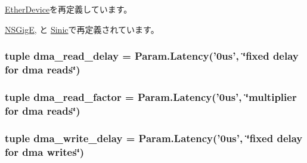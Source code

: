 \hyperlink{classEthernet_1_1EtherDevice_a17da7064bc5c518791f0c891eff05fda}{EtherDevice}を再定義しています。

\hyperlink{classEthernet_1_1NSGigE_a17da7064bc5c518791f0c891eff05fda}{NSGigE}, と \hyperlink{classEthernet_1_1Sinic_a17da7064bc5c518791f0c891eff05fda}{Sinic}で再定義されています。\hypertarget{classEthernet_1_1EtherDevBase_ae1796dfc751bce0b1ed6f89fe1f18f74}{
\subsubsection[{dma\_\-read\_\-delay}]{\setlength{\rightskip}{0pt plus 5cm}tuple {\bf dma\_\-read\_\-delay} = Param.Latency('0us', \char`\"{}fixed delay for dma reads\char`\"{})}}
\label{classEthernet_1_1EtherDevBase_ae1796dfc751bce0b1ed6f89fe1f18f74}
\hypertarget{classEthernet_1_1EtherDevBase_a9447bf3b5b6f66d9835e219b5cead65c}{
\subsubsection[{dma\_\-read\_\-factor}]{\setlength{\rightskip}{0pt plus 5cm}tuple {\bf dma\_\-read\_\-factor} = Param.Latency('0us', \char`\"{}multiplier for dma reads\char`\"{})}}
\label{classEthernet_1_1EtherDevBase_a9447bf3b5b6f66d9835e219b5cead65c}
\hypertarget{classEthernet_1_1EtherDevBase_a9d3ab02a832357b6fb582d9cefbb1ccd}{
\subsubsection[{dma\_\-write\_\-delay}]{\setlength{\rightskip}{0pt plus 5cm}tuple {\bf dma\_\-write\_\-delay} = Param.Latency('0us', \char`\"{}fixed delay for dma writes\char`\"{})}}
